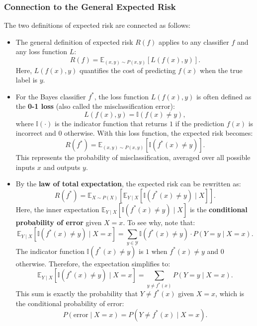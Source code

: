 \begin{notechapter}
\subsubsection{Connection to the General Expected Risk}
The two definitions of expected risk are connected as follows:

\begin{itemize}
    \item The general definition of expected risk \( R(f) \) applies to any classifier \( f \) and any loss function \( L \):
      \[
      R(f) = \mathbb{E}_{(x,y) \sim P(x,y)}[L(f(x), y)].
      \]
      Here, \( L(f(x), y) \) quantifies the cost of predicting \( f(x) \) when the true label is \( y \).

    \item For the Bayes classifier \( f^* \), the loss function \( L(f(x), y) \) is often defined as the \textbf{0-1 loss} (also called the misclassification error):
      \[
      L(f(x), y) = \mathbb{I}(f(x) \neq y),
      \]
      where \( \mathbb{I}(\cdot) \) is the indicator function that returns \( 1 \) if the prediction \( f(x) \) is incorrect and \( 0 \) otherwise. With this loss function, the expected risk becomes:
      \[
      R(f^*) = \mathbb{E}_{(x,y) \sim P(x,y)}[\mathbb{I}(f^*(x) \neq y)].
      \]
      This represents the probability of misclassification, averaged over all possible inputs \( x \) and outputs \( y \).

    \item By the \textbf{law of total expectation}, the expected risk can be rewritten as:
      \[
      R(f^*) = \mathbb{E}_{X \sim P(X)}[\mathbb{E}_{Y \mid X}[\mathbb{I}(f^*(x) \neq y) \mid X]].
      \]
      Here, the inner expectation \( \mathbb{E}_{Y \mid X}[\mathbb{I}(f^*(x) \neq y) \mid X] \) is the \textbf{conditional probability of error} given \( X = x \). To see why, note that:
      \[
      \mathbb{E}_{Y \mid X}[\mathbb{I}(f^*(x) \neq y) \mid X = x] = \sum_{y \in \mathcal{Y}} \mathbb{I}(f^*(x) \neq y) \cdot P(Y = y \mid X = x).
      \]
      The indicator function \( \mathbb{I}(f^*(x) \neq y) \) is \( 1 \) when \( f^*(x) \neq y \) and \( 0 \) otherwise. Therefore, the expectation simplifies to:
      \[
      \mathbb{E}_{Y \mid X}[\mathbb{I}(f^*(x) \neq y) \mid X = x] = \sum_{y \neq f^*(x)} P(Y = y \mid X = x).
      \]
      This sum is exactly the probability that \( Y \neq f^*(x) \) given \( X = x \), which is the conditional probability of error:
      \[
      P(\text{error} \mid X = x) = P(Y \neq f^*(x) \mid X = x).
      \]


\end{itemize}
\end{notechapter}
